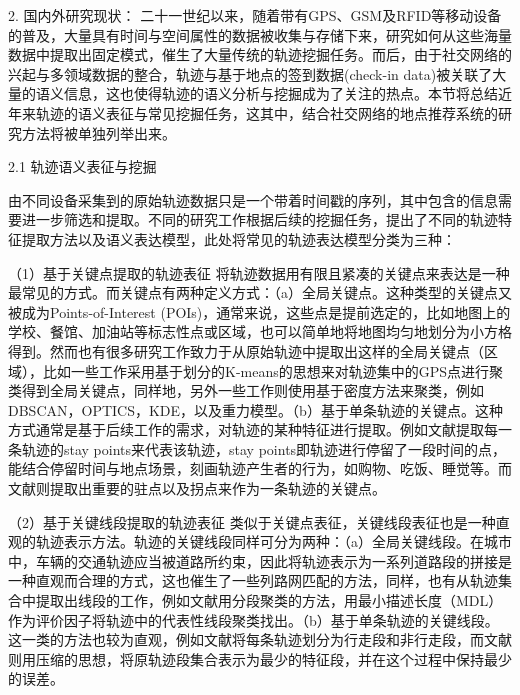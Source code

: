 2. 国内外研究现状：
二十一世纪以来，随着带有GPS、GSM及RFID等移动设备的普及，大量具有时间与空间属性的数据被收集与存储下来，研究如何从这些海量数据中提取出固定模式，催生了大量传统的轨迹挖掘任务。而后，由于社交网络的兴起与多领域数据的整合，轨迹与基于地点的签到数据(check-in data)被关联了大量的语义信息，这也使得轨迹的语义分析与挖掘成为了关注的热点。本节将总结近年来轨迹的语义表征与常见挖掘任务，这其中，结合社交网络的地点推荐系统的研究方法将被单独列举出来。

2.1 轨迹语义表征与挖掘

由不同设备采集到的原始轨迹数据只是一个带着时间戳的序列，其中包含的信息需要进一步筛选和提取。不同的研究工作根据后续的挖掘任务，提出了不同的轨迹特征提取方法以及语义表达模型，此处将常见的轨迹表达模型分类为三种：

（1）基于关键点提取的轨迹表征
将轨迹数据用有限且紧凑的关键点来表达是一种最常见的方式。而关键点有两种定义方式：（a）全局关键点。这种类型的关键点又被成为Points-of-Interest (POIs)，通常来说，这些点是提前选定的，比如地图上的学校、餐馆、加油站等标志性点或区域，也可以简单地将地图均匀地划分为小方格得到\cite{giannotti2007trajectory,wei2012constructing,shang2014inferring,wang2014travel,yuan2015discovering,xue2013destination,zheng2015approximate,cho2011friendship}。然而也有很多研究工作致力于从原始轨迹中提取出这样的全局关键点（区域），比如一些工作\cite{ashbrook2002learning,ashbrook2003using}采用基于划分的K-means的思想来对轨迹集中的GPS点进行聚类得到全局关键点，同样地，另外一些工作则使用基于密度方法来聚类，例如DBSCAN，OPTICS，KDE，以及重力模型\cite{li2010mining,zheng2011recommending,jeung2008discovery,chen2011discovering,zheng2008understanding,wang2015regularity}。（b）基于单条轨迹的关键点。这种方式通常是基于后续工作的需求，对轨迹的某种特征进行提取。例如文献\cite{li2008mining,zheng2011learning}提取每一条轨迹的stay points来代表该轨迹，stay points即轨迹进行停留了一段时间的点，能结合停留时间与地点场景，刻画轨迹产生者的行为，如购物、吃饭、睡觉等。而文献\cite{adrienko2011spatial}则提取出重要的驻点以及拐点来作为一条轨迹的关键点。

（2）基于关键线段提取的轨迹表征
类似于关键点表征，关键线段表征也是一种直观的轨迹表示方法。轨迹的关键线段同样可分为两种：（a）全局关键线段。在城市中，车辆的交通轨迹应当被道路所约束，因此将轨迹表示为一系列道路段的拼接是一种直观而合理的方式，这也催生了一些列路网匹配的方法\cite{greenfeld2002matching,chen2003integrated,newson2009hidden}，同样，也有从轨迹集合中提取出线段的工作，例如文献\cite{lee2007trajectory}用分段聚类的方法，用最小描述长度（MDL）作为评价因子将轨迹中的代表性线段聚类找出。（b）基于单条轨迹的关键线段。这一类的方法也较为直观，例如文献\cite{zheng2008learning,zheng2008understanding}将每条轨迹划分为行走段和非行走段，而文献\cite{lee2011trajectory,douglas1973algorithms,bellman1961approximation} 则用压缩的思想，将原轨迹段集合表示为最少的特征段，并在这个过程中保持最少的误差。

